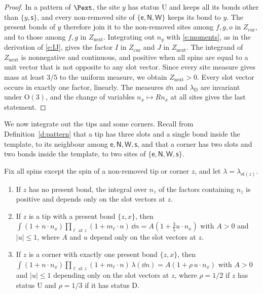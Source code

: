 \begin{proof}
In a pattern of $\Pext$, the site $y$ has status $\mathrm U$ and keeps all its bonds other than $\{y, \mathsf s\}$, and every non-removed site of $\{\mathsf e, \mathsf N, \mathsf W\}$ keeps its bond to $y$. The present bonds of $y$ therefore join it to the non-removed sites among $f, g, o$ in $Z_{\mathrm{cur}}$, and to those among $f, g$ in $Z_{\mathrm{next}}$. Integrating out $n_y$ with \eqref{e:moments}, as in the derivation of \eqref{e:IJ}, gives the factor $I$ in $Z_{\mathrm{cur}}$ and $J$ in $Z_{\mathrm{next}}$. The integrand of $Z_{\mathrm{next}}$ is nonnegative and continuous, and positive when all spins are equal to a unit vector that is not opposite to any slot vector. Since every site measure gives mass at least $3/5$ to the uniform measure, we obtain $Z_{\mathrm{next}} > 0$. Every slot vector occurs in exactly one factor, linearly. The measures $\dd n$ and $\lambda_{\mathrm D}$ are invariant under $\mathrm O(3)$, and the change of variables $n_x \mapsto R n_x$ at all sites gives the last statement.
\end{proof}

We now integrate out the tips and some corners. Recall from Definition~\ref{d:pattern} that a tip has three slots and a single bond inside the template, to its neighbour among $\mathsf e, \mathsf N, \mathsf W, \mathsf s$, and that a corner has two slots and two bonds inside the template, to two sites of $\{\mathsf e, \mathsf N, \mathsf W, \mathsf s\}$.

\begin{lemma}\label{l:leaf}
Fix all spins except the spin of a non-removed tip or corner $z$, and let $\lambda = \lambda_{\mathrm{st}(z)}$.
\begin{enumerate}
\item If $z$ has no present bond, the integral over $n_z$ of the factors containing $n_z$ is positive and depends only on the slot vectors at $z$.
\item If $z$ is a tip with a present bond $\{z, x\}$, then $\int (1 + n \cdot n_x) \prod_{\ell \text{ at } z} (1 + m_\ell \cdot n) \, \dd n = A (1 + \frac35 u \cdot n_x)$ with $A > 0$ and $|u| \le 1$, where $A$ and $u$ depend only on the slot vectors at $z$.
\item If $z$ is a corner with exactly one present bond $\{z, x\}$, then $\int (1 + n \cdot n_x) \prod_{\ell \text{ at } z} (1 + m_\ell \cdot n) \, \lambda(\dd n) = A (1 + \rho \, u \cdot n_x)$ with $A > 0$ and $|u| \le 1$ depending only on the slot vectors at $z$, where $\rho = 1/2$ if $z$ has status $\mathrm U$ and $\rho = 1/3$ if it has status $\mathrm D$.
\end{enumerate}
\end{lemma}

